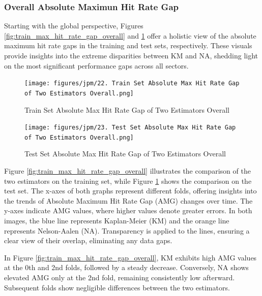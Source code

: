 \subsubsection{Overall Absolute Maximun Hit Rate Gap}
Starting with the global perspective, Figures \ref{fig:train_max_hit_rate_gap_overall} and \ref{fig:test_max_hit_rate_gap_overall} offer a holistic view of the absolute maximum hit rate gaps in the training and test sets, respectively. These visuals provide insights into the extreme disparities between KM and NA, shedding light on the most significant performance gaps across all sectors.

\begin{figure}[H]
    \centering
    \begin{minipage}{0.48\textwidth}
        \centering
        \texttt{[image: figures/jpm/22. Train Set Absolute Max Hit Rate Gap of Two Estimators Overall.png]}
        \caption{Train Set Absolute Max Hit Rate Gap of Two Estimators Overall}
        \label{fig:train_max_hit_rate_gap_overall}
    \end{minipage}\hfill
    \begin{minipage}{0.45\textwidth}
        \centering
        \texttt{[image: figures/jpm/23. Test Set Absolute Max Hit Rate Gap of Two Estimators Overall.png]}
        \caption{Test Set Absolute Max Hit Rate Gap of Two Estimators Overall}
        \label{fig:test_max_hit_rate_gap_overall}
    \end{minipage}
\end{figure}

Figure \ref{fig:train_max_hit_rate_gap_overall} illustrates the comparison of the two estimators on the training set, while Figure \ref{fig:test_max_hit_rate_gap_overall} shows the comparison on the test set. The x-axes of both graphs represent different folds, offering insights into the trends of Absolute Maximum Hit Rate Gap (AMG) changes over time. The y-axes indicate AMG values, where higher values denote greater errors. In both images, the blue line represents Kaplan-Meier (KM) and the orange line represents Nelson-Aalen (NA). Transparency is applied to the lines, ensuring a clear view of their overlap, eliminating any data gaps.

In Figure \ref{fig:train_max_hit_rate_gap_overall}, KM exhibits high AMG values at the 0th and 2nd folds, followed by a steady decrease. Conversely, NA shows elevated AMG only at the 2nd fold, remaining consistently low afterward. Subsequent folds show negligible differences between the two estimators.

